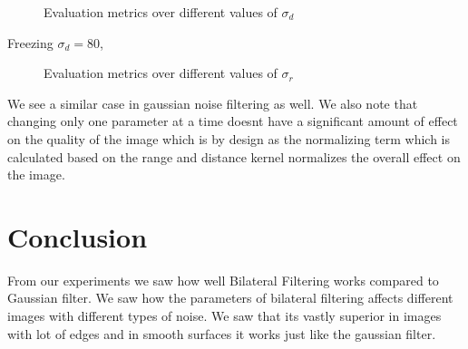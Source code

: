 \documentclass[a4paper, english]{article}
\begin{document}
\begin{figure}[H]
\centering
    \caption{Evaluation metrics over different values of $\sigma_d$}
\end{figure}

Freezing $\sigma_d = 80$,

\begin{figure}[H]
\centering
    \caption{Evaluation metrics over different values of $\sigma_r$}
\end{figure}

We see a similar case in gaussian noise filtering as well. We also note that changing only one parameter at a time doesnt have a significant amount of effect on the quality of the image which is by design as the normalizing term which is calculated based on the range and distance kernel normalizes the overall effect on the image.

\section{Conclusion}
From our experiments we saw how well Bilateral Filtering works compared to Gaussian filter. We saw how the parameters of bilateral filtering affects different images with different types of noise. We saw that its vastly superior in images with lot of edges and in smooth surfaces it works just like the gaussian filter. 
\end{document}
